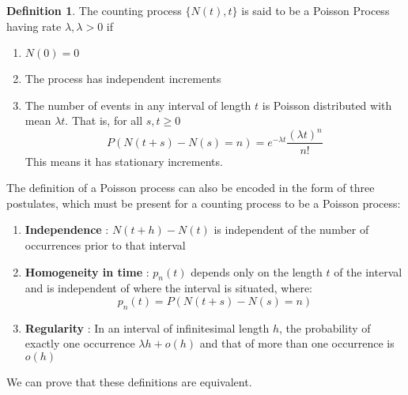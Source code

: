 \documentclass[12pt,letterpaper]{book}
\theoremstyle{definition}
\newtheorem{definition}{Definition}%
\begin{document}
\begin{definition}
  The counting process $\{N(t),t\}$ is said to be a Poisson Process having rate $\lambda, \lambda > 0$ if 
  \begin{enumerate}
    \item $N(0) = 0$
    \item The process has independent increments
    \item The number of events in any interval of length $t$ is Poisson distributed with mean $\lambda t$. That is, for all $s,t \geq 0$
      \[P(N(t+s) - N(s) = n) = e^{- \lambda t}\frac{(\lambda t) ^ n}{n!}\]
      This means it has stationary increments.
  \end{enumerate}
\end{definition}

The definition of a Poisson process can also be encoded in the form of three postulates, which must be present for a counting process to be a Poisson process:

\begin{enumerate}
  \item \textbf{Independence} : $N(t+h) - N(t)$ is independent of the number of occurrences prior to that interval
  \item \textbf{Homogeneity in time} : $p_n(t)$ depends only on the length $t$ of the interval and is independent of where the interval is situated, where:
    \[p_n(t) = P(N(t+s) - N(s) = n)\]
  \item \textbf{Regularity} : In an interval of infinitesimal length $h$, the probability of exactly one occurrence $\lambda h + o(h)$ and that of more than one occurrence is $o(h)$
\end{enumerate}

We can prove that these definitions are equivalent.
\end{document}
